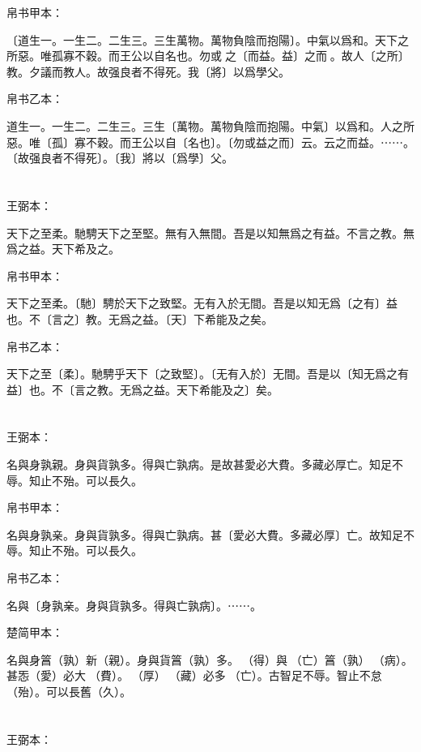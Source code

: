 \documentclass[a5paper]{ctexbook}
\begin{document}
    
    帛书甲本：

    〔道生一。一生二。二生三。三生萬物。萬物負陰而抱陽〕。中氣以爲和。天下之所惡。唯孤寡不穀。而王公以自名也。勿或𢿃之〔而益。益〕之而𢿃。故人〔之所〕教。夕議而教人。故强良者不得死。我〔將〕以爲學父。

    帛书乙本：

    道生一。一生二。二生三。三生〔萬物。萬物負陰而抱陽。中氣〕以爲和。人之所惡。唯〔孤〕寡不穀。而王公以自〔名也〕。〔勿或益之而〕云。云之而益。⋯⋯。〔故强良者不得死〕。〔我〕將以〔爲學〕父。

    \chapter{}
    王弼本：

    天下之至柔。馳騁天下之至堅。無有入無間。吾是以知無爲之有益。不言之教。無爲之益。天下希及之。

    
    帛书甲本：

    天下之至柔。〔馳〕騁於天下之致堅。无有入於无間。吾是以知无爲〔之有〕益也。不〔言之〕教。无爲之益。〔天〕下希能及之矣。

    帛书乙本：

    天下之至〔柔〕。馳騁乎天下〔之致堅〕。〔无有入於〕无間。吾是以〔知无爲之有益〕也。不〔言之教。无爲之益。天下希能及之〕矣。

    \chapter{}
    王弼本：

    名與身孰親。身與貨孰多。得與亡孰病。是故甚愛必大費。多藏必厚亡。知足不辱。知止不殆。可以長久。

    
    帛书甲本：

    名與身孰亲。身與貨孰多。得與亡孰病。甚〔愛必大費。多藏必厚〕亡。故知足不辱。知止不殆。可以長久。

    帛书乙本：

    名與〔身孰亲。身與貨孰多。得與亡孰病〕。⋯⋯。

    楚简甲本：

    名與身䈞（孰）新（親）。身與貨䈞（孰）多。󰴼（得）與󶵔（亡）䈞（孰）󶓄（病）。甚㤅（愛）必大󶵖（費）。󶵗（厚）󶤖（藏）必多󶵔（亡）。古智足不辱。智止不怠（殆）。可以長舊（久）。

    \chapter{}
    王弼本：
\end{document}
